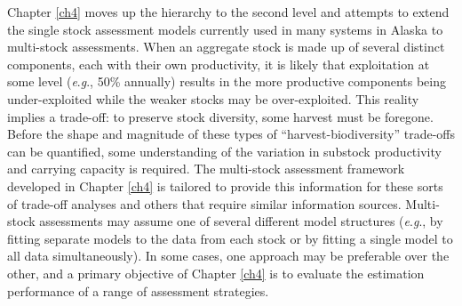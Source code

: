 \documentclass[12pt,]{book}
\theoremstyle{definition}
\theoremstyle{definition}
\theoremstyle{definition}
\theoremstyle{remark}
\begin{document}
Chapter \ref{ch4} moves up the hierarchy to the second level and
attempts to extend the single stock assessment models currently used in
many systems in Alaska to multi-stock assessments. When an aggregate
stock is made up of several distinct components, each with their own
productivity, it is likely that exploitation at some level
(\emph{e}.\emph{g}., 50\% annually) results in the more productive
components being under-exploited while the weaker stocks may be
over-exploited. This reality implies a trade-off: to preserve stock
diversity, some harvest must be foregone. Before the shape and magnitude
of these types of ``harvest-biodiversity'' trade-offs can be quantified,
some understanding of the variation in substock productivity and
carrying capacity is required. The multi-stock assessment framework
developed in Chapter \ref{ch4} is tailored to provide this information
for these sorts of trade-off analyses and others that require similar
information sources. Multi-stock assessments may assume one of several
different model structures (\emph{e}.\emph{g}., by fitting separate
models to the data from each stock or by fitting a single model to all
data simultaneously). In some cases, one approach may be preferable over
the other, and a primary objective of Chapter \ref{ch4} is to evaluate
the estimation performance of a range of assessment strategies.

\newpage
\end{document}
